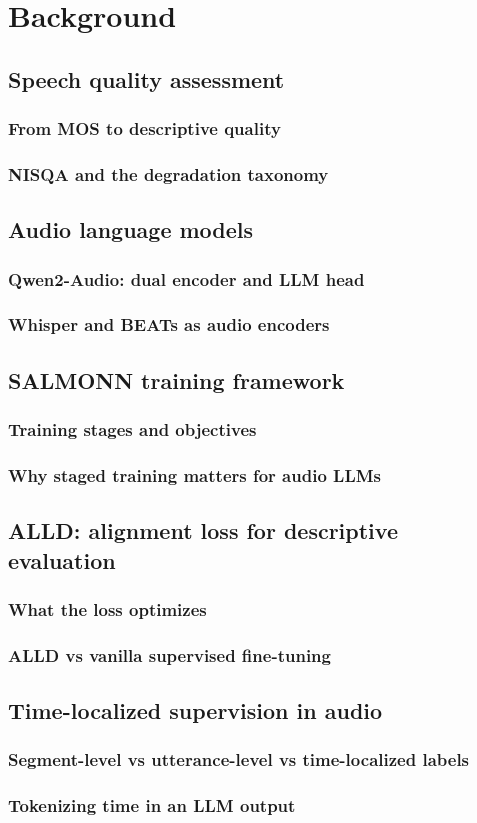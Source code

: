 \chapter{Background} \label{ch:background}

\section{Speech quality assessment} \label{sec:sqa}
\subsection{From MOS to descriptive quality}
\subsection{NISQA and the degradation taxonomy}

\section{Audio language models} \label{sec:audio-llms}
\subsection{Qwen2-Audio: dual encoder and LLM head}
\subsection{Whisper and BEATs as audio encoders}

\section{SALMONN training framework} \label{sec:salmonn}
\subsection{Training stages and objectives}
\subsection{Why staged training matters for audio LLMs}

\section{ALLD: alignment loss for descriptive evaluation} \label{sec:alld}
\subsection{What the loss optimizes}
\subsection{ALLD vs vanilla supervised fine-tuning}

\section{Time-localized supervision in audio} \label{sec:temporal-supervision}
\subsection{Segment-level vs utterance-level vs time-localized labels}
\subsection{Tokenizing time in an LLM output}
